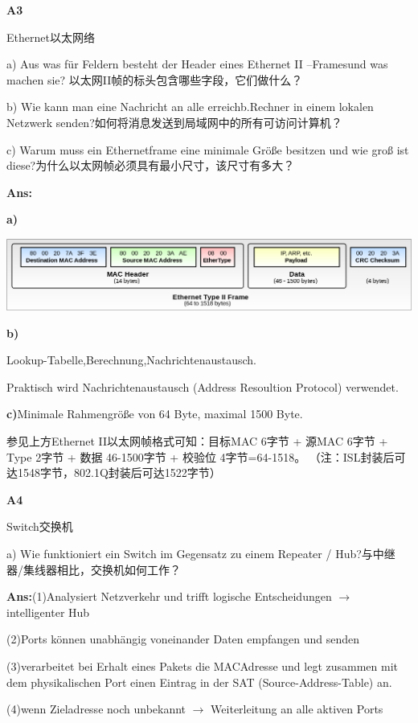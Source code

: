 \documentclass[fleqn]{article}
\begin{document}
\noindent\textbf{A3}

Ethernet以太网络

a) Aus was für Feldern besteht der Header eines Ethernet II –Framesund was machen sie? 以太网II帧的标头包含哪些字段，它们做什么？

b) Wie kann man eine Nachricht an alle erreichb.Rechner in einem lokalen Netzwerk senden?如何将消息发送到局域网中的所有可访问计算机？

c) Warum muss ein Ethernetframe eine minimale Größe besitzen und wie groß ist diese?为什么以太网帧必须具有最小尺寸，该尺寸有多大？

\textbf{Ans:}

\textbf{a)}

\begin{center}
    \includegraphics[scale=0.4]{bild16.png}
\end{center}

\textbf{b)}

Lookup-Tabelle,Berechnung,Nachrichtenaustausch.

Praktisch wird Nachrichtenaustausch (Address Resoultion Protocol) verwendet.

\textbf{c)}Minimale Rahmengröße von 64 Byte, maximal 1500 Byte.

参见上方Ethernet II以太网帧格式可知：目标MAC 6字节 + 源MAC 6字节 + Type 2字节 + 数据 46-1500字节 + 校验位 4字节=64-1518。
（注：ISL封装后可达1548字节，802.1Q封装后可达1522字节）

\noindent\textbf{A4}

Switch交换机

a) Wie funktioniert ein Switch im Gegensatz zu einem Repeater / Hub?与中继器/集线器相比，交换机如何工作？

\textbf{Ans:}(1)Analysiert Netzverkehr und trifft logische Entscheidungen $\rightarrow$ intelligenter Hub

\indent\indent(2)Ports können unabhängig voneinander Daten empfangen und senden

\indent\indent(3)verarbeitet bei Erhalt eines Pakets die MACAdresse und legt zusammen mit dem physikalischen Port einen Eintrag in der SAT (Source-Address-Table) an.

\indent\indent(4)wenn Zieladresse noch unbekannt $\rightarrow$ Weiterleitung an alle aktiven Ports
\end{document}
